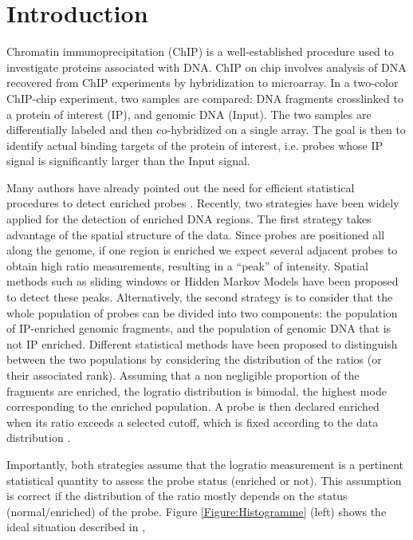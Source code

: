 \documentclass{llncs}
\begin{document}
\section{Introduction}
Chromatin immunoprecipitation (ChIP) is a well-established procedure
used to investigate proteins associated with DNA. ChIP on chip
involves analysis of DNA recovered from ChIP experiments by
hybridization to microarray. In a two-color ChIP-chip experiment,
two samples are compared: DNA fragments crosslinked to a protein of
interest (IP), and genomic DNA (Input). The two samples are
differentially labeled and then co-hybridized on a single array. The
goal is then to identify actual binding targets of the protein of
interest, i.e. probes whose IP signal is significantly larger than
the Input signal. {\par} Many authors have already pointed out the
need for efficient statistical procedures to detect enriched probes
\cite{BuckLieb04,Keles07}. Recently, two strategies have been widely
applied for the detection of enriched DNA regions. The first
strategy takes advantage of the spatial structure of the data. Since
probes are positioned all along the genome, if one region is
enriched we expect several adjacent probes to obtain high ratio
measurements, resulting in a ``peak'' of intensity. Spatial methods
such as sliding windows \cite{Cawley04,Keles07} or Hidden Markov
Models \cite{JiWong05,LiMeyerLiu05} have been proposed to detect
these peaks. Alternatively, the second strategy is to consider that
the whole population of probes can be divided into two components:
the population of IP-enriched genomic fragments, and the population
of genomic DNA that is not IP enriched. Different statistical
methods have been proposed to distinguish between the two
populations by considering the distribution of the ratios (or their
associated rank). Assuming that a non negligible proportion of the
fragments are enriched, the logratio distribution is bimodal, the
highest mode corresponding to the enriched population. A probe is
then declared enriched when its ratio exceeds a selected cutoff,
which is fixed according to the data distribution \cite{BuckLieb04}.
{\par} Importantly, both strategies assume that the logratio
measurement is a pertinent statistical quantity to assess the probe
status (enriched or not). This assumption is correct if the
distribution of the ratio mostly depends on the status
(normal/enriched) of the probe. Figure \ref{Figure:Histogramme}
(left) shows the ideal situation described in \cite{BuckLieb04},
\end{document}

